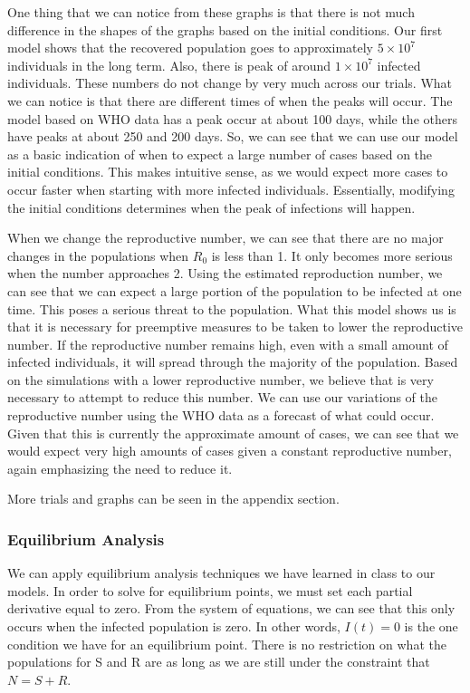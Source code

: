 \documentclass[12pt, a4paper]{article}
\begin{document}
        One thing that we can notice from these graphs is that there is not much difference in the shapes of the graphs based on the initial conditions. Our first model shows that the recovered population goes to approximately $5 \times 10^7$ individuals in the long term. Also, there is peak of around $1 \times 10^7$ infected individuals. These numbers do not change by very much across our trials. What we can notice is that there are different times of when the peaks will occur. The model based on WHO data has a peak occur at about 100 days, while the others have peaks at about 250 and 200 days. So, we can see that we can use our model as a basic indication of when to expect a large number of cases based on the initial conditions. This makes intuitive sense, as we would expect more cases to occur faster when starting with more infected individuals. Essentially, modifying the initial conditions determines when the peak of infections will happen.
        
        When we change the reproductive number, we can see that there are no major changes in the populations when $R_0$ is less than 1. It only becomes more serious when the number approaches 2. Using the estimated reproduction number, we can see that we can expect a large portion of the population to be infected at one time. This poses a serious threat to the population. What this model shows us is that it is necessary for preemptive measures to be taken to lower the reproductive number. If the reproductive number remains high, even with a small amount of infected individuals, it will spread through the majority of the population. Based on the simulations with a lower reproductive number, we believe that is very necessary to attempt to reduce this number. We can use our variations of the reproductive number using the WHO data as a forecast of what could occur. Given that this is currently the approximate amount of cases, we can see that we would expect very high amounts of cases given a constant reproductive number, again emphasizing the need to reduce it.
        
        More trials and graphs can be seen in the appendix section.
        
        \subsubsection{Equilibrium Analysis}
        
        We can apply equilibrium analysis techniques we have learned in class to our models. In order to solve for equilibrium points, we must set each partial derivative equal to zero. From the system of equations, we can see that this only occurs when the infected population is zero. In other words, $I(t)=0$ is the one condition we have for an equilibrium point. There is no restriction on what the populations for S and R are as long as we are still under the constraint that $N = S + R$. 
        
\end{document}
